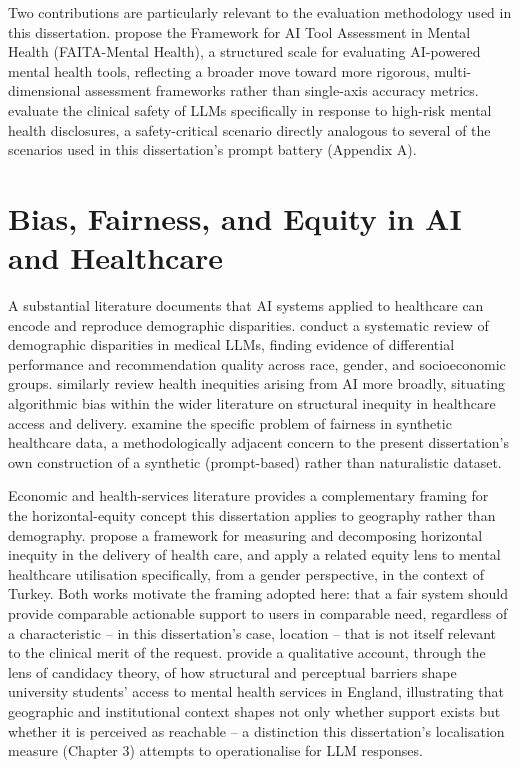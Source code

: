 Two contributions are particularly relevant to the evaluation methodology used in this dissertation. \citet{golden2024faita} propose the Framework for AI Tool Assessment in Mental Health (FAITA-Mental Health), a structured scale for evaluating AI-powered mental health tools, reflecting a broader move toward more rigorous, multi-dimensional assessment frameworks rather than single-axis accuracy metrics. \citet{santos2026clinical} evaluate the clinical safety of LLMs specifically in response to high-risk mental health disclosures, a safety-critical scenario directly analogous to several of the scenarios used in this dissertation's prompt battery (Appendix A).

\section{Bias, Fairness, and Equity in AI and Healthcare}

A substantial literature documents that AI systems applied to healthcare can encode and reproduce demographic disparities. \citet{omar2024disparities} conduct a systematic review of demographic disparities in medical LLMs, finding evidence of differential performance and recommendation quality across race, gender, and socioeconomic groups. \citet{li2024inequities} similarly review health inequities arising from AI more broadly, situating algorithmic bias within the wider literature on structural inequity in healthcare access and delivery. \citet{bhanot2021fairness} examine the specific problem of fairness in synthetic healthcare data, a methodologically adjacent concern to the present dissertation's own construction of a synthetic (prompt-based) rather than naturalistic dataset.

Economic and health-services literature provides a complementary framing for the horizontal-equity concept this dissertation applies to geography rather than demography. \citet{zhao2020equity} propose a framework for measuring and decomposing horizontal inequity in the delivery of health care, and \citet{basar2020equity} apply a related equity lens to mental healthcare utilisation specifically, from a gender perspective, in the context of Turkey. Both works motivate the framing adopted here: that a fair system should provide comparable actionable support to users in comparable need, regardless of a characteristic -- in this dissertation's case, location -- that is not itself relevant to the clinical merit of the request. \citet{osborn2024students} provide a qualitative account, through the lens of candidacy theory, of how structural and perceptual barriers shape university students' access to mental health services in England, illustrating that geographic and institutional context shapes not only whether support exists but whether it is perceived as reachable -- a distinction this dissertation's localisation measure (Chapter 3) attempts to operationalise for LLM responses.

